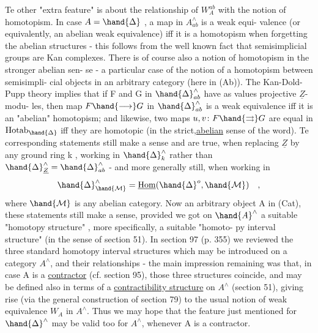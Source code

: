 
Te other "extra feature"  is about  the relationship of $W^{ab}_{A}$  with
the notion of homotopism.  In case $A = \hand{\Delta}$ ,  a map in $A^{\wedge}_{ab}$  is a weak equi-%
valence (or equivalently,  an abelian weak equivalence)  iff it is a
homotopism when forgetting the abelian structures  -  this follows from
the well known fact that semisimplicial groups are Kan complexes.  There
is of course also a notion  of homotopism in the stronger abelian sen-%
se -  a particular case of the notion of a homotopism between semisimpli-%
cial objects in an arbitrary category (here in (Ab)).  The Kan-Dold-Pupp
theory implies that if F and G in $\hand{\Delta}^{\wedge}_{ab}$  have as values projective $\underline{Z}$-modu-%
les,  then  map  $F \hand{\longrightarrow} G$ in $\hand{\Delta}^{\wedge}_{ab}$  is a weak equivalence iff it is an
"abelian" homotopism;  and likewise,  two maps  $u,v\colon F \hand{\rightrightarrows} G$  are equal
in $\mathrm{Hotab}_{\hand{\Delta}}$  iff they are homotopic (in the strict,\uline{abelian} sense of the
word).  Te corresponding statements still make a sense and are true,
when replacing $\underline{Z}$ by any ground ring k ,  working in $\hand{\Delta}^{\wedge}_{k}$  rather than
$\hand{\Delta}^{\wedge}_{\underline{Z}} = \hand{\Delta}^{\wedge}_{ab}$   -  and more generally still,  when working in
\[ \hand{\Delta}^{\wedge}_{\hand{\mathcal{M}}} = \underline{\mathrm{Hom}}(\hand{\Delta}^{o}, \hand{\mathcal{M}}) \quad , \]
where $\hand{\mathcal{M}}$ is any abelian category.  Now   an arbitrary object A in
(Cat),  these statements still make a sense,  provided we got on $\hand{A}^{\wedge}$ a
suitable "homotopy structure" ,  more specifically,  a suitable "homoto-%
py interval structure" (in the sense of section 51).  In section 97
(p. 355) we reviewed the three standard homotopy interval structures
which may be introduced on a category $A^{\wedge}$,  and their relationships -
the main impression remaining was that,  in case A is a \uline{contractor}
(cf. section 95),  those three structures coincide,  and may be defined
also in terms of a \uline{contractibility structure} on $A^{\wedge}$ (section 51),  giving
rise (via the general construction of section 79) to the usual notion
of weak equivalence $W_{A}$ in $A^{\wedge}$.  Thus we may hope that the feature just
mentioned  for $\hand{\Delta}^{\wedge}$ may be valid too for $A^{\wedge}$,  whenever A is a contractor.

